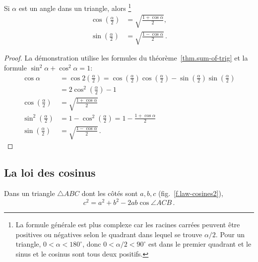 \begin{theorem}\label{thm.sine-cosine-half}
Si $\alpha$ est un angle dans un triangle, alors \footnote{La formule générale est plus complexe car les racines carrées peuvent être positives ou négatives selon le quadrant dans lequel se trouve $\alpha/2$. 
Pour un triangle, $0\!<\!\alpha\!<\!180^\circ$, donc $0\!<\!\alpha/2\!<\!90^\circ$ est dans le premier quadrant et le sinus et le cosinus sont tous deux positifs.}
\begin{align*}
\cos \left(\frac{\alpha}{2}\right)&=\sqrt{\frac{1+\cos\alpha}{2}},\\
\sin\left(\frac{\alpha}{2}\right)&=\sqrt{\frac{1-\cos\alpha}{2}}\,.
\end{align*}
\end{theorem}

\begin{proof}
La démonstration utilise les formules du théorème~\ref{thm.sum-of-trig} et la formule $\sin^2\alpha+\cos^2\alpha=1$:
\begin{align*}
\cos \alpha&=\cos 2\left(\frac{\alpha}{2}\right)=\cos \left(\frac{\alpha}{2}\right)\cos\left(\frac{\alpha}{2}\right)-\sin \left(\frac{\alpha}{2}\right)\sin\left(\frac{\alpha}{2}\right)\\
&=2\cos^2 \left(\frac{\alpha}{2}\right)-1\\
\cos \left(\frac{\alpha}{2}\right)&=\sqrt{\frac{1+\cos\alpha}{2}}\\
\sin^2\left(\frac{\alpha}{2}\right)&= 1-\cos^2\left(\frac{\alpha}{2}\right)=1-\frac{1+\cos\alpha}{2}\\
\sin \left(\frac{\alpha}{2}\right)&=\sqrt{\frac{1-\cos\alpha}{2}}\,.
\end{align*}
\end{proof}


\subsection{La loi des cosinus}

\begin{theorem}
Dans un triangle $\triangle ABC$ dont les côtés sont $a,b,c$ (fig.~\ref{f.law-cosines2}),\label{thm.law-of-cosines}
\[
c^2=a^2+b^2-2ab\cos \angle ACB\,.
\]
\end{theorem}

\medskip

